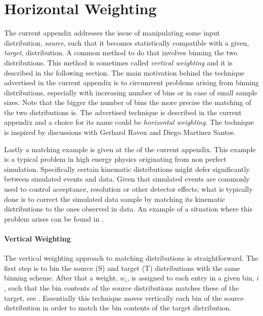 
\chapter{Horizontal Weighting}
\label{AppendixB}

The current appendix addresses the issue of manipulating some input distribution, {\it source}, such that
it becomes statistically compatible with a given, {\it target}, distribution. A common method to do that
involves binning the two distributions. This method is sometimes called {\it vertical weighting}
and it is described in the following section. The main motivation behind the technique advertised in the current
appendix is to circumvent problems arising from binning distributions, especially with increasing number of
bins or in case of small sample sizes. Note that the bigger the number of bins the more precise the matching of the two distributions
is. The advertised technique is described in the current appendix and a choice for its name could be {\it horizontal weighting}.
The technique is inspired by discussions with Gerhard Raven and Diego Martinez Santos.

Lastly a matching example is given at the of the current appendix. This example is a typical problem
in high energy physics originating from non perfect simulation. Specifically certain kinematic
distributions might defer significantly between simulated events and data. Given that simulated
events are commonly used to control acceptance, resolution or other detector effects; what is typically
done is to correct the simulated data sample by matching its kinematic distributions to the ones observed in data.
An example of a situation where this problem arises can be found in .

\subsubsection{Vertical Weighting}
The vertical weighting approach to matching distributions is straightforward.
The first step is to bin the source (S) and target (T) distributions with the same binning scheme.
After that a weight, $w_i$, is assigned to each entry in a given bin, $i$, such that the bin
contents of the source distributions matches these of the target, see .
Essentially this technique moves vertically each bin of the source distribution in order to match
the bin contents of the target distribution.

